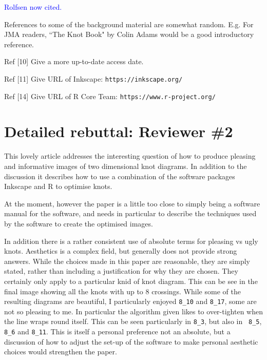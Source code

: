 \documentclass[12pt]{article}
\begin{document}
\textcolor{blue}{Rolfsen now cited.}

References to some of the background material are somewhat random.
E.g.  For JMA readers, ``The Knot Book" by Colin Adams would be a good
introductory reference.

Ref [10]  Give a more up-to-date access date.

Ref [11]  Give URL of  Inkscape:  {\tt https://inkscape.org/}

Ref [14]  Give URL of  R Core Team:  {\tt https://www.r-project.org/}


\section*{Detailed rebuttal: Reviewer \#2}

This lovely article addresses the interesting question of
how to produce pleasing and informative images of two dimensional knot
diagrams. In addition to the discussion it describes how to use a
combination of the software packages Inkscape and R to optimise knots.

At the moment, however the paper is a little too close to simply being
a software manual for the software, and needs in particular to
describe the techniques used by the software to create the optimised
images.

In addition there is a rather consistent use of absolute terms for
pleasing vs ugly knots. Aesthetics is a complex field, but generally
does not provide strong answers. While the choices made in this paper
are reasonable, they are simply stated, rather than including a
justification for why they are chosen. They certainly only apply to a
particular knid of knot diagram. This can be see in the final image
showing all the knots with up to 8 crossings. While some of the
resulting diagrams are beautiful, I particularly enjoyed {\tt 8\_10}
and {\tt 8\_17}, some are not so pleasing to me. In particular the
algorithm given likes to over-tighten when the line wraps round
itself. This can be seen particularly in {\tt 8\_3}, but also in {\tt
  8\_5}, {\tt 8\_6} and {\tt 8\_11}. This is itself a personal
preference not an absolute, but a discussion of how to adjust the
set-up of the software to make personal aesthetic choices would
strengthen the paper.
\end{document}
